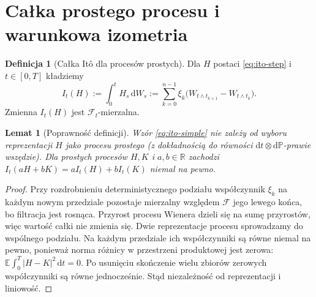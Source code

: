 \documentclass[11pt,a4paper,oneside]{report}
\numberwithin{equation}{chapter}
\theoremstyle{plain}
\newtheorem{lemat}[twierdzenie]{Lemat}
\theoremstyle{definition}
\newtheorem{definicja}{Definicja}[chapter]
\theoremstyle{remark}
\newcommand{\R}{\mathbb{R}}
\newcommand{\Prob}{\mathbb{P}}
\newcommand{\E}{\mathbb{E}}
\newcommand{\calF}{\mathcal{F}}
\newcommand{\dd}{\mathrm{d}}
\begin{document}
\section{Całka prostego procesu i warunkowa izometria}
\begin{definicja}[Całka Itô dla procesów prostych]
Dla $H$ postaci \eqref{eq:ito-step} i $t\in[0,T]$ kładziemy
\[
I_t(H):=\int_0^t H_s\,\dd W_s
:=\sum_{k=0}^{n-1}\xi_k
\big(W_{t\wedge t_{k+1}}-W_{t\wedge t_k}\big).
\tag{2.2}\label{eq:ito-simple}
\]
Zmienna $I_t(H)$ jest $\calF_t$-mierzalna.
\end{definicja}

\begin{lemat}[Poprawność definicji]
Wzór \eqref{eq:ito-simple} nie zależy od wyboru
reprezentacji $H$ jako procesu prostego (z dokładnością
do równości $\dd t\otimes\dd\Prob$-prawie wszędzie).
Dla prostych procesów $H,K$ i $a,b\in\R$ zachodzi
$I_t(aH+bK)=aI_t(H)+bI_t(K)$ niemal na pewno.
\end{lemat}
\begin{proof}
Przy rozdrobnieniu deterministycznego podziału współczynnik
$\xi_k$ na każdym nowym przedziale pozostaje mierzalny
względem $\calF$ jego lewego końca, bo filtracja jest rosnąca.
Przyrost procesu Wienera dzieli się na sumę przyrostów,
więc wartość całki nie zmienia się. Dwie reprezentacje
procesu sprowadzamy do wspólnego podziału. Na każdym
przedziale ich współczynniki są równe niemal na pewno,
ponieważ norma różnicy w przestrzeni produktowej jest zerowa:
$\E\int_0^T|H-K|^2\,\dd t=0$.
Po usunięciu skończenie wielu zbiorów zerowych
współczynniki są równe jednocześnie. Stąd niezależność
od reprezentacji i liniowość.
\end{proof}
\end{document}
